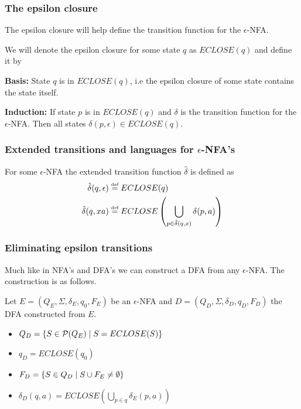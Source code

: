 \subsubsection{The epsilon closure}
The epsilon closure will help define the transition function for the $\epsilon$-NFA. 

\begin{definition} \label{def:eps-closure}
    We will denote the epsilon closure for some state $q$ as $ECLOSE(q)$ and define it by 

    \textbf{Basis:} State $q$ is in $ECLOSE(q)$, i.e the epsilon closure of some state contains the state itself. 

    \textbf{Induction:} If state $p$ is in $ECLOSE(q)$ and $\delta$ is the transition function for the $\epsilon$-NFA. Then all states $\delta(p, \epsilon) \in ECLOSE(q)$.
\end{definition}

\subsubsection{Extended transitions and languages for $\epsilon$-NFA's}
For some $\epsilon$-NFA the extended transition function $\hat\delta$ is defined as 
\begin{align*}
    \hat\delta(q, \epsilon) &\stackrel {\mbox{\tiny def}}{=} ECLOSE(q) \\
    \hat\delta(q, xa) &\stackrel {\mbox{\tiny def}}{=} ECLOSE\left(\bigcup_{p\in \hat\delta(q,x)} \delta(p,a) \right)
\end{align*}

\subsubsection{Eliminating epsilon transitions}
Much like in NFA's and DFA's we can construct a DFA from any $\epsilon$-NFA. The construction is as follows.

Let $E = (Q_E, \Sigma, \delta_E, q_0, F_E)$ be an $\epsilon$-NFA and $D = (Q_D, \Sigma, \delta_D, q_D, F_D)$ the DFA constructed from $E$.
\begin{itemize}
    \item $Q_D = \left\{ S\in \mathcal{P}(Q_E) \mid  S = ECLOSE(S) \right\}$
    \item $q_D = ECLOSE(q_0)$
    \item $F_D = \left\{ S\in Q_D \mid  S \cup F_E \neq \emptyset \right\}$
    \item $\delta_D(q, a) = ECLOSE\left( \bigcup_{p\in q} \delta_E(p,a)\right)$
\end{itemize}